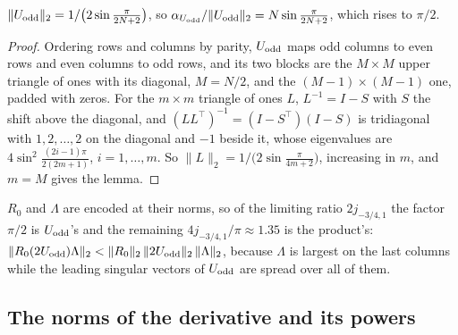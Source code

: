 \begin{lemma}
\label{lem:uodd-norm}
$\|U_{\mathrm{odd}}\|_2=1/\bigl(2\sin\frac{\pi}{2N+2}\bigr)$, so $\alpha_{U_{\mathrm{odd}}}/\|U_{\mathrm{odd}}\|_2=N\sin\frac{\pi}{2N+2}$, which rises to $\pi/2$.
\end{lemma}
\begin{proof}
Ordering rows and columns by parity, $U_{\mathrm{odd}}$ maps odd columns to even rows and even columns to odd rows, and its two blocks are the $M\times M$ upper triangle of ones with its diagonal, $M=N/2$, and the $(M-1)\times(M-1)$ one, padded with zeros. For the $m\times m$ triangle of ones $L$, $L^{-1}=I-S$ with $S$ the shift above the diagonal, and $(LL^{\top})^{-1}=(I-S^{\top})(I-S)$ is tridiagonal with $1,2,\dots,2$ on the diagonal and $-1$ beside it, whose eigenvalues are $4\sin^2\frac{(2i-1)\pi}{2(2m+1)}$, $i=1,\dots,m$. So $\|L\|_2=1/\bigl(2\sin\frac{\pi}{4m+2}\bigr)$, increasing in $m$, and $m=M$ gives the lemma.
\end{proof}

$R_0$ and $\Lambda$ are encoded at their norms, so of the limiting ratio $2j_{-3/4,1}$ the factor $\pi/2$ is $U_{\mathrm{odd}}$'s and the remaining $4j_{-3/4,1}/\pi\approx1.35$ is the product's: $\|R_0(2U_{\mathrm{odd}})\Lambda\|_2<\|R_0\|_2\,\|2U_{\mathrm{odd}}\|_2\,\|\Lambda\|_2$, because $\Lambda$ is largest on the last columns while the leading singular vectors of $U_{\mathrm{odd}}$ are spread over all of them.

\subsection{The norms of the derivative and its powers}
\label{app:G-limits}

